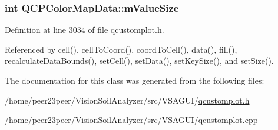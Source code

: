 \subsubsection[{m\+Value\+Size}]{\setlength{\rightskip}{0pt plus 5cm}int Q\+C\+P\+Color\+Map\+Data\+::m\+Value\+Size\hspace{0.3cm}{\ttfamily [protected]}}\label{class_q_c_p_color_map_data_ae8ee9093632a59f55eb4fc06579ed256}


Definition at line 3034 of file qcustomplot.\+h.



Referenced by cell(), cell\+To\+Coord(), coord\+To\+Cell(), data(), fill(), recalculate\+Data\+Bounds(), set\+Cell(), set\+Data(), set\+Key\+Size(), and set\+Size().



The documentation for this class was generated from the following files\+:\begin{DoxyCompactItemize}
\item 
/home/peer23peer/\+Vision\+Soil\+Analyzer/src/\+V\+S\+A\+G\+U\+I/\hyperlink{qcustomplot_8h}{qcustomplot.\+h}\item 
/home/peer23peer/\+Vision\+Soil\+Analyzer/src/\+V\+S\+A\+G\+U\+I/\hyperlink{qcustomplot_8cpp}{qcustomplot.\+cpp}\end{DoxyCompactItemize}
